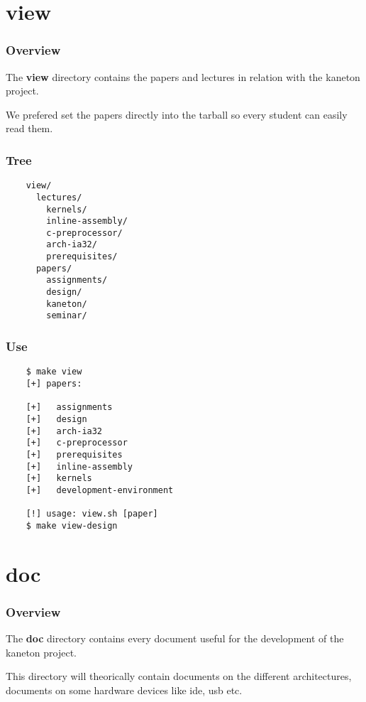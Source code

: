 %
%

\section{view}


\begin{frame}
  \frametitle{Overview}

  The \textbf{view} directory contains the papers and lectures
  in relation with the kaneton project.

  \nl

  We prefered set the papers directly into the tarball so every student
  can easily read them.
\end{frame}


\begin{frame}[containsverbatim]
  \frametitle{Tree}

  \begin{verbatim}
    view/
      lectures/
        kernels/
        inline-assembly/
        c-preprocessor/
        arch-ia32/
        prerequisites/
      papers/
        assignments/
        design/
        kaneton/
        seminar/
  \end{verbatim}
\end{frame}


\begin{frame}[containsverbatim]
  \frametitle{Use}

  \begin{verbatim}
    $ make view
    [+] papers:

    [+]   assignments
    [+]   design
    [+]   arch-ia32
    [+]   c-preprocessor
    [+]   prerequisites
    [+]   inline-assembly
    [+]   kernels
    [+]   development-environment

    [!] usage: view.sh [paper]
    $ make view-design
  \end{verbatim}
\end{frame}

%
%

\section{doc}


\begin{frame}
  \frametitle{Overview}

  The \textbf{doc} directory contains every document useful for
  the development of the kaneton project.

  \nl

  This directory will theorically contain documents on the different
  architectures, documents on some hardware devices like ide, usb etc.
\end{frame}


